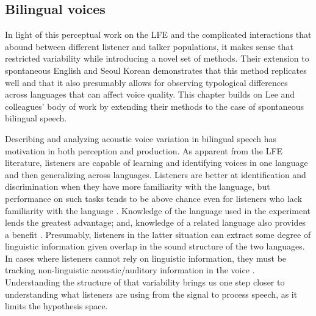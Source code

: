 \subsection{Bilingual voices}\label{ch3:sec:clxcomparisons}

In light of this perceptual work on the LFE and the complicated interactions that abound between different listener and talker populations, it makes sense that \citet{lee_2019_acoustic} restricted variability while introducing a novel set of methods. Their extension to spontaneous English and Seoul Korean demonstrates that this method replicates well and that it also presumably allows for observing typological differences across languages that can affect voice quality. This chapter builds on Lee and colleagues' body of work by extending their methods to the case of spontaneous bilingual speech. 

Describing and analyzing acoustic voice variation in bilingual speech has motivation in both perception and production. As apparent from the LFE literature, listeners are capable of learning and identifying voices in one language and then generalizing across languages. Listeners are better at identification and discrimination when they have more familiarity with the language, but performance on such tasks tends to be above chance even for listeners who lack familiarity with the language \citep[e.g.,][]{orena_2019_identifying}. Knowledge of the language used in the experiment lends the greatest advantage; and, knowledge of a related language also provides a benefit \citep{zarate_2015_multiple}. Presumably, listeners in the latter situation can extract some degree of linguistic information given overlap in the sound structure of the two languages. In cases where listeners cannot rely on linguistic information, they must be tracking non-linguistic acoustic/auditory information in the voice \citep{perrachione_2019_judgments}. Understanding the structure of that variability brings us one step closer to understanding what listeners are using from the signal to process speech, as it limits the hypothesis space. 

